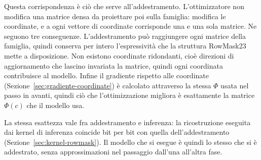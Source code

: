 Questa corrispondenza è ciò che serve all'addestramento. L'ottimizzatore non modifica una matrice densa da proiettare poi sulla famiglia: modifica le coordinate, e a ogni vettore di coordinate corrisponde una e una sola matrice. Ne seguono tre conseguenze. L'addestramento può raggiungere ogni matrice della famiglia, quindi conserva per intero l'espressività che la struttura RowMask23 mette a disposizione. Non esistono coordinate ridondanti, cioè direzioni di aggiornamento che lascino invariata la matrice, quindi ogni coordinata contribuisce al modello. Infine il gradiente rispetto alle coordinate (Sezione~\ref{sec:gradiente-coordinate}) è calcolato attraverso la stessa $\Phi$ usata nel passo in avanti, quindi ciò che l'ottimizzazione migliora è esattamente la matrice $\Phi(c)$ che il modello usa.

La stessa esattezza vale fra addestramento e inferenza: la ricostruzione eseguita dai kernel di inferenza coincide bit per bit con quella dell'addestramento (Sezione~\ref{sec:kernel-rowmask}). Il modello che si esegue è quindi lo stesso che si è addestrato, senza approssimazioni nel passaggio dall'una all'altra fase.
